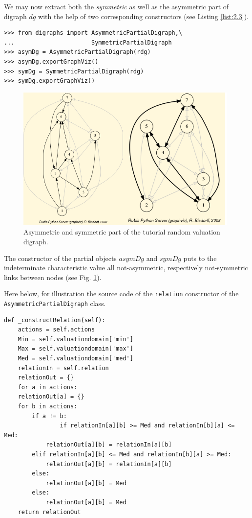 We may now extract both the \emph{}\emph{symmetric} as well as the asymmetric part of digraph $dg$ with the help of two corresponding constructors (see Listing \ref{list:2.3}).
\begin{lstlisting}[caption={Computing asymmetric and symmetric Parts},label=list:2.3]
>>> from digraphs import AsymmetricPartialDigraph,\
...                      SymmetricPartialDigraph
>>> asymDg = AsymmetricPartialDigraph(rdg)
>>> asymDg.exportGraphViz()
>>> symDg = SymmetricPartialDigraph(rdg)
>>> symDg.exportGraphViz()
\end{lstlisting}
\begin{figure}[h]
\includegraphics[width=11cm]{Figures/asymSymParts.png}
\caption{Asymmetric and symmetric part of the tutorial random valuation digraph.}
\label{fig:2.2}       %
\end{figure}
The constructor of the partial objects $asymDg$ and $symDg$ puts to the indeterminate characteristic value all not-asymmetric, respectively not-symmetric links between nodes (see Fig. \ref{fig:2.2}).

Here below, for illustration the source code of the {\tt relation} constructor of the {\tt AsymmetricPartialDigraph} class.
\begin{lstlisting}[label=list:2.4,basicstyle=\scriptsize]
def _constructRelation(self):
    actions = self.actions
    Min = self.valuationdomain['min']
    Max = self.valuationdomain['max']
    Med = self.valuationdomain['med']
    relationIn = self.relation
    relationOut = {}
    for a in actions:
	relationOut[a] = {}
	for b in actions:
	    if a != b:
                if relationIn[a][b] >= Med and relationIn[b][a] <= Med:
		    relationOut[a][b] = relationIn[a][b]
		elif relationIn[a][b] <= Med and relationIn[b][a] >= Med:
		    relationOut[a][b] = relationIn[a][b]
		else:
		    relationOut[a][b] = Med
		else:
		    relationOut[a][b] = Med
    return relationOut
\end{lstlisting}

